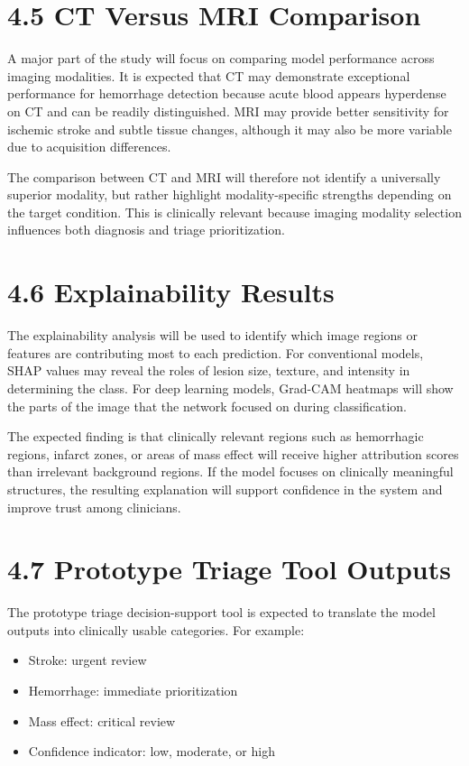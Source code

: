 \documentclass[12pt,a4paper]{report}
\begin{document}
\section{4.5 CT Versus MRI Comparison}

A major part of the study will focus on comparing model performance across imaging modalities. It is expected that CT may demonstrate exceptional performance for hemorrhage detection because acute blood appears hyperdense on CT and can be readily distinguished. MRI may provide better sensitivity for ischemic stroke and subtle tissue changes, although it may also be more variable due to acquisition differences.

The comparison between CT and MRI will therefore not identify a universally superior modality, but rather highlight modality-specific strengths depending on the target condition. This is clinically relevant because imaging modality selection influences both diagnosis and triage prioritization.

\section{4.6 Explainability Results}

The explainability analysis will be used to identify which image regions or features are contributing most to each prediction. For conventional models, SHAP values may reveal the roles of lesion size, texture, and intensity in determining the class. For deep learning models, Grad-CAM heatmaps will show the parts of the image that the network focused on during classification.

The expected finding is that clinically relevant regions such as hemorrhagic regions, infarct zones, or areas of mass effect will receive higher attribution scores than irrelevant background regions. If the model focuses on clinically meaningful structures, the resulting explanation will support confidence in the system and improve trust among clinicians.

\section{4.7 Prototype Triage Tool Outputs}

The prototype triage decision-support tool is expected to translate the model outputs into clinically usable categories. For example:

\begin{itemize}
\item Stroke: urgent review
\item Hemorrhage: immediate prioritization
\item Mass effect: critical review
\item Confidence indicator: low, moderate, or high
\end{itemize}
\end{document}
